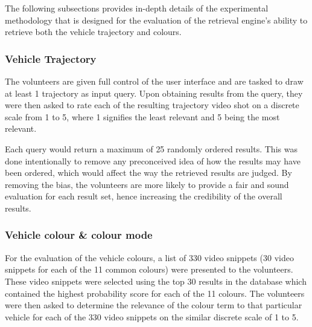 The following subsections provides in-depth details of the experimental methodology that is designed for the evaluation of the retrieval engine's ability to retrieve both the vehicle trajectory and colours.

\vspace{1em}
\subsubsection{Vehicle Trajectory}
The volunteers are given full control of the user interface and are tasked to draw at least 1 trajectory as input query. Upon obtaining results from the query, they were then asked to rate each of the resulting trajectory video shot on a discrete scale from 1 to 5, where 1 signifies the least relevant and 5 being the most relevant.

Each query would return a maximum of 25 randomly ordered results. This was done intentionally to remove any preconceived idea of how the results may have been ordered, which would affect the way the retrieved results are judged. By removing the bias, the volunteers are more likely to provide a fair and sound evaluation for each result set, hence increasing the credibility of the overall results.

\vspace{1em}
\subsubsection{Vehicle colour \& colour mode}
\label{subsec:vehColor}
For the evaluation of the vehicle colours, a list of 330 video snippets (30 video snippets for each of the 11 common colours) were presented to the volunteers. These video snippets were selected using the top 30 results in the database which contained the highest probability score for each of the 11
colours. The volunteers were then asked to determine the relevance of the colour term to that particular vehicle for each of the 330 video snippets on the similar discrete scale of 1 to 5.


